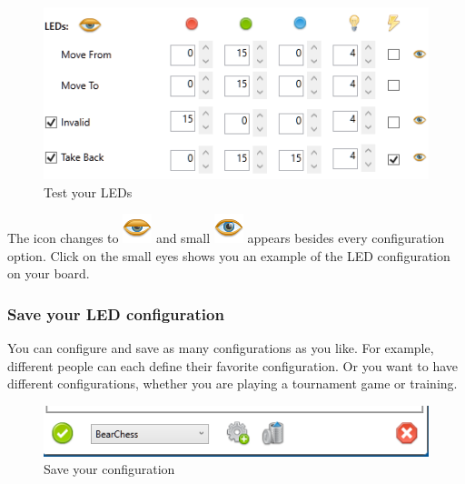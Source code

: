 \documentclass[11pt,a4paper]{article}
\begin{document}
\begin{figure}[H]
	\centering
	\includegraphics[scale=1.0]{iChessOne6.png}
	\caption{Test your LEDs }
	\label{fig:iChessOne9}
\end{figure}
The icon changes to \includegraphics[scale=0.4]{eye_half.png} and small \includegraphics[scale=0.3]{eye.png} appears besides every configuration option. Click on the small eyes shows you an example of the LED configuration on your board.

\subsubsection{Save your LED configuration}
You can configure and save as many configurations as you like. For example, different people can each define their favorite configuration. Or you want to have different configurations, whether you are playing a tournament game or training.

\begin{figure}[H]
	\centering
	\includegraphics[scale=1.0]{iChessOne7.png}
	\caption{Save your configuration}
	\label{fig:iChessOne10}
\end{figure}
\end{document}
